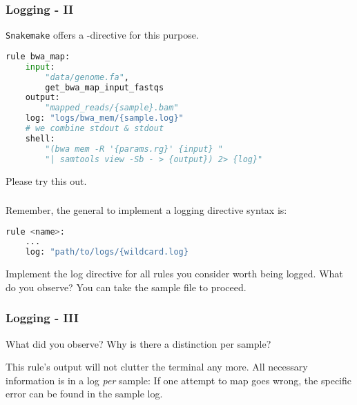 \begin{frame}[fragile]
  \frametitle{Logging - II}
  \texttt{Snakemake} offers a -directive for this purpose.  
  \begin{lstlisting}[language=Python,style=Python]
rule bwa_map:
    input:
        "data/genome.fa",
        get_bwa_map_input_fastqs
    output:
        "mapped_reads/{sample}.bam"
    log: "logs/bwa_mem/{sample.log}"
    # we combine stdout & stdout
    shell:
        "(bwa mem -R '{params.rg}' {input} "
        "| samtools view -Sb - > {output}) 2> {log}"
   \end{lstlisting}
   \begin{task}
     Please try this out.
   \end{task}
\end{frame}

\begin{frame}[fragile]
  \frametitle{}
  \begin{task}
  	 Remember, the general to implement a logging directive syntax is:
  	 \begin{lstlisting}[language=Python,style=Python]
rule <name>:
    ...
    log: "path/to/logs/{wildcard.log}
  	\end{lstlisting}
    Implement the log directive for all rules you consider worth being logged. What do you observe?
    \newline
    You can take the  sample file to proceed.
  \end{task}
\end{frame}

\begin{frame}
  \frametitle{Logging - III}
  \begin{question}[Questions]
  	 What did you observe? Why is there a distinction per sample?
  \end{question}
  \pause
  \begin{docs}
  	This rule's output will not clutter the terminal any more. All necessary information is in a log \emph{per} sample: If one attempt to map goes wrong, the specific error can be found in the sample log.
  \end{docs}
\end{frame}

